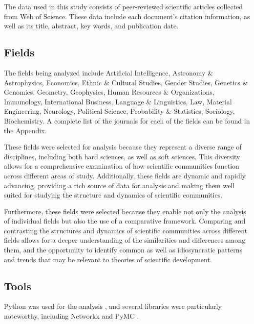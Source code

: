 The data used in this study consists of peer-reviewed scientific articles collected from Web of 
Science. These data include each document's citation information, as well as its title, abstract, 
key words, and publication date.

\subsection{Fields}

The fields being analyzed include Artificial Intelligence, Astronomy \& Astrophysics, Economics, 
Ethnic \& Cultural Studies, Gender Studies, Genetics \& Genomics, Geometry, Geophysics, Human 
Resources \& Organizations, Immunology, International Business, Language \& Linguistics, Law, 
Material Engineering, Neurology, Political Science, Probability \& Statistics, Sociology, 
Biochemistry. A complete list of the journals for each of the fields can be found in the Appendix.

These fields were selected for analysis because they represent a diverse range of disciplines, 
including both hard sciences, as well as soft sciences. This diversity allows for a comprehensive 
examination of how scientific communities function across different areas of study. Additionally, 
these fields are dynamic and rapidly advancing, providing a rich source of data for analysis and 
making them well suited for studying the structure and dynamics of scientific communities. 

Furthermore, these fields were selected because they enable not only the analysis of individual 
fields but also the use of a comparative framework. Comparing and contrasting the structures and 
dynamics of scientific communities across different fields allows for a deeper understanding of the 
similarities and differences among them, and the opportunity to identify common as well as 
idiosyncratic patterns and trends that may be relevant to theories of scientific development.

\subsection{Tools}

Python was used for the analysis \citep{rossum2010}, and several libraries were particularly 
noteworthy, including Networkx \citep{hagberg2008} and PyMC \citep{salvatier2016}.